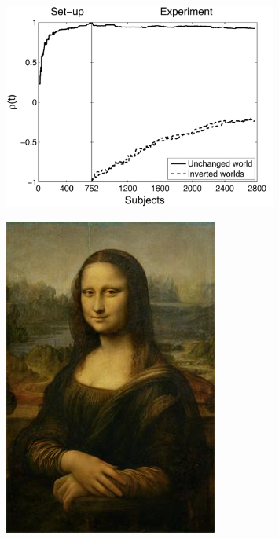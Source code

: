\documentclass[aspectratio=169]{beamer}
\begin{document}
\begin{frame}

\begin{figure}
  \centering
  \includegraphics[width=0.8\textwidth]{figures/dynamics_rankcorr_exp3_v34_nolabel}
\end{figure}

\end{frame}
\begin{frame}

\begin{figure}
  \centering
  \includegraphics[height=0.8\textheight]{figures/monalisa}
\end{figure}

\end{frame}
\end{document}
